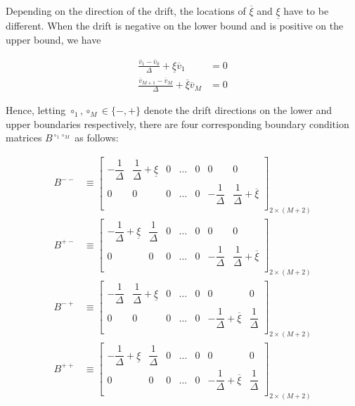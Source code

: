 \documentclass[11pt]{article}
\theoremstyle{definition}
\begin{document}
Depending on the direction of the drift, the locations of $\overline{\xi}$ and $\underline{\xi}$ have to be different. When the drift is negative on the lower bound and is positive on the upper bound, we have

\begin{align}
\frac{\overline{v}_1 - \overline{v}_0}{\Delta} + \underline{\xi} \overline{v}_1 &= 0 \label{eq:mixed-BC1-negative}  \\
\frac{\overline{v}_{M+1} - \overline{v}_M}{\Delta} + \overline{\xi} \overline{v}_{M} &= 0 \label{eq:mixed-BC2-positive}
\end{align}

Hence, letting $\circ_1, \circ_M \in \{-, +\}$ denote the drift directions on the lower and upper boundaries respectively, there are four corresponding boundary condition matrices $B^{\circ_1 \circ_M}$ as follows:
 
\begin{align}
B^{--} &\equiv 
\begin{bmatrix}
-\dfrac{1}{\Delta} & \dfrac{1}{\Delta}  + \underline{\xi} & 0 & \dots & 0 & 0 & 0 \\
0 & 0 & 0 & \dots & 0 & -\dfrac{1}{\Delta} & \dfrac{1}{\Delta} + \overline{\xi}\\
\end{bmatrix}_{2 \times (M+2)} \\
B^{+-} &\equiv 
\begin{bmatrix}
-\dfrac{1}{\Delta} + \underline{\xi} & \dfrac{1}{\Delta} & 0 & \dots & 0 & 0 & 0 \\
0 & 0 & 0 & \dots & 0 & -\dfrac{1}{\Delta} & \dfrac{1}{\Delta} + \overline{\xi}\\
\end{bmatrix}_{2 \times (M+2)} \\
B^{-+} &\equiv 
\begin{bmatrix}
-\dfrac{1}{\Delta}  & \dfrac{1}{\Delta} + \underline{\xi} & 0 & \dots & 0 & 0 & 0 \\
0 & 0 & 0 & \dots & 0 & -\dfrac{1}{\Delta}+ \overline{\xi} & \dfrac{1}{\Delta}\\
\end{bmatrix}_{2 \times (M+2)} \\
B^{++} &\equiv 
\begin{bmatrix}
-\dfrac{1}{\Delta} + \underline{\xi} & \dfrac{1}{\Delta} & 0 & \dots & 0 & 0 & 0 \\
0 & 0 & 0 & \dots & 0 & -\dfrac{1}{\Delta}+ \overline{\xi} & \dfrac{1}{\Delta} \\
\end{bmatrix}_{2 \times (M+2)}
\end{align}
\end{document}
